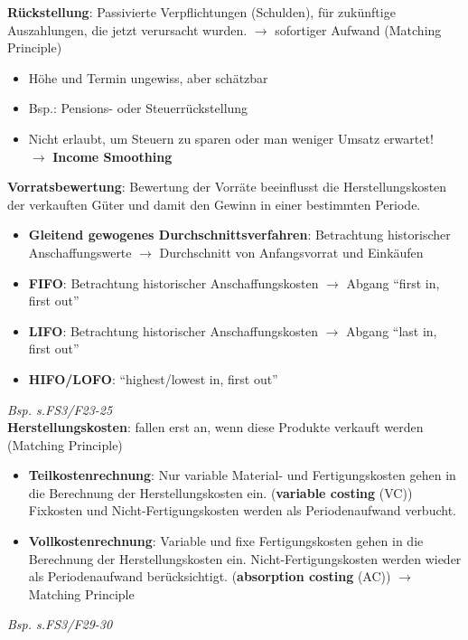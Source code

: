 \textbf{Rückstellung}: Passivierte Verpflichtungen (Schulden), für zukünftige Auszahlungen, die jetzt verursacht wurden. $\rightarrow$ sofortiger Aufwand (Matching Principle)
\begin{itemize}
	\item Höhe und Termin ungewiss, aber schätzbar
	\item Bsp.: Pensions- oder Steuerrückstellung
	\item Nicht erlaubt, um Steuern zu sparen oder man weniger Umsatz erwartet!\\
	$\rightarrow$ \textbf{Income Smoothing}
\end{itemize}
\bigskip
\textbf{Vorratsbewertung}: Bewertung der Vorräte beeinflusst die Herstellungskosten der verkauften Güter und damit den Gewinn in einer bestimmten Periode.
\begin{itemize}
	\item \textbf{Gleitend gewogenes Durchschnittsverfahren}: Betrachtung historischer Anschaffungswerte $\rightarrow$ Durchschnitt von Anfangsvorrat und Einkäufen
	\item \textbf{FIFO}: Betrachtung historischer Anschaffungskosten $\rightarrow$ Abgang \enquote{first in, first out}
	\item \textbf{LIFO}: Betrachtung historischer Anschaffungskosten $\rightarrow$ Abgang \enquote{last in, first out}
	\item \textbf{HIFO/LOFO}: \enquote{highest/lowest in, first out}
\end{itemize}
\textit{Bsp. s.FS3/F23-25}\\

\textbf{Herstellungskosten}: fallen erst an, wenn diese Produkte verkauft werden (Matching Principle)
\begin{itemize}
	\item \textbf{Teilkostenrechnung}: Nur variable Material- und Fertigungskosten gehen in die Berechnung der Herstellungskosten ein. (\textbf{variable costing} (VC))
	Fixkosten und Nicht-Fertigungskosten werden als Periodenaufwand verbucht.
	\item \textbf{Vollkostenrechnung}: Variable und fixe Fertigungskosten gehen in die Berechnung der Herstellungskosten ein.
	Nicht-Fertigungskosten werden wieder als Periodenaufwand berücksichtigt. (\textbf{absorption costing} (AC))
	$\rightarrow$ Matching Principle
\end{itemize}
\textit{Bsp. s.FS3/F29-30}